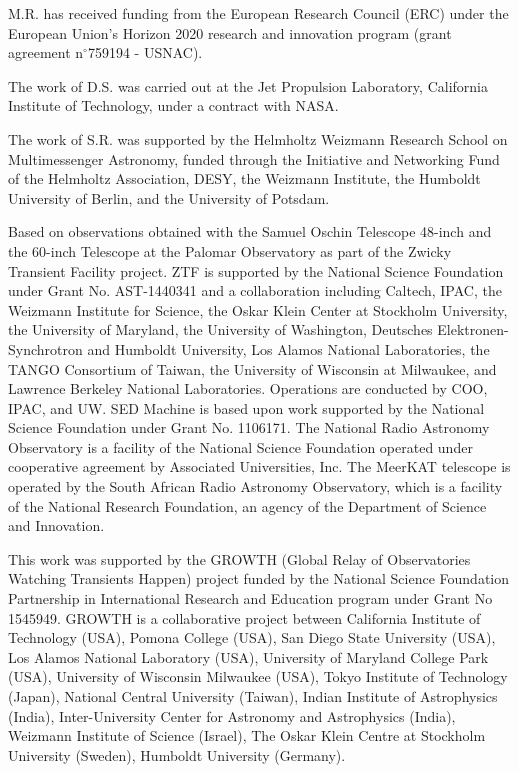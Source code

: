 \documentclass{nature_plusfigure}
\begin{document}
\begin{addendum}
M.R. has received funding from the European Research Council (ERC) under the European Union’s Horizon 2020 research and innovation program (grant agreement n$^\circ$759194 - USNAC). 

The work of D.S. was carried out at the Jet Propulsion Laboratory, California Institute of Technology, under a contract with NASA.

The work of S.R. was supported by the Helmholtz Weizmann Research School on Multimessenger Astronomy, funded through the Initiative and Networking Fund of the Helmholtz Association, DESY, the Weizmann Institute, the Humboldt University of Berlin, and the University of Potsdam.

Based on observations obtained with the Samuel Oschin Telescope 48-inch and the 60-inch Telescope at the Palomar Observatory as part of the Zwicky Transient Facility project. ZTF is supported by the National Science Foundation under Grant No. AST-1440341 and a collaboration including Caltech, IPAC, the Weizmann Institute for Science, the Oskar Klein Center at Stockholm University, the University of Maryland, the University of Washington, Deutsches Elektronen-Synchrotron and Humboldt University, Los Alamos National Laboratories, the TANGO Consortium of Taiwan, the University of Wisconsin at Milwaukee, and Lawrence Berkeley National Laboratories. Operations are conducted by COO, IPAC, and UW. SED Machine is based upon work supported by the National Science Foundation under Grant No. 1106171. The National Radio Astronomy Observatory is a facility of the National Science Foundation operated under cooperative agreement by Associated Universities, Inc. The MeerKAT telescope is operated by  the South African Radio Astronomy Observatory, which is a facility  of the National Research Foundation, an agency of the Department of Science and Innovation.

This work was supported by the GROWTH (Global Relay of Observatories Watching Transients Happen) project funded by the National Science Foundation Partnership in International Research and Education program under Grant No 1545949. GROWTH is a collaborative project between California Institute of Technology (USA), Pomona College (USA), San Diego State University (USA), Los Alamos National Laboratory (USA), University of Maryland College Park (USA), University of Wisconsin Milwaukee (USA), Tokyo Institute of Technology (Japan), National Central University (Taiwan), Indian Institute of Astrophysics (India), Inter-University Center for Astronomy and Astrophysics (India), Weizmann Institute of Science (Israel), The Oskar Klein Centre at Stockholm University (Sweden), Humboldt University (Germany).


\end{addendum}
\end{document}
